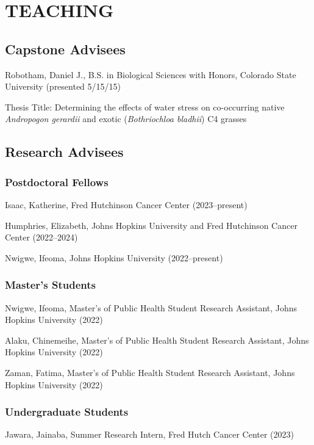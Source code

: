 \documentclass{cv}
\begin{document}
\section*{TEACHING}


\subsection*{Capstone Advisees}

Robotham, Daniel J., B.S. in Biological Sciences with Honors, Colorado State University (presented 5/15/15)

Thesis Title: Determining the effects of water stress on co-occurring native \textit{Andropogon gerardii} and exotic (\textit{Bothriochloa bladhii}) C4 grasses

\subsection*{Research Advisees}

\subsubsection*{Postdoctoral Fellows}

Isaac, Katherine, Fred Hutchinson Cancer Center (2023--present)

Humphries, Elizabeth, Johns Hopkins University and Fred Hutchinson Cancer Center (2022--2024)

Nwigwe, Ifeoma, Johns Hopkins University (2022--present)

\subsubsection*{Master's Students}

Nwigwe, Ifeoma, Master's of Public Health Student Research Assistant, Johns Hopkins University (2022)

Alaku, Chinemeihe, Master's of Public Health Student Research Assistant, Johns Hopkins University (2022)

Zaman, Fatima, Master's of Public Health Student Research Assistant, Johns Hopkins University (2022)

\subsubsection*{Undergraduate Students}

Jawara, Jainaba, Summer Research Intern, Fred Hutch Cancer Center (2023)
\end{document}
